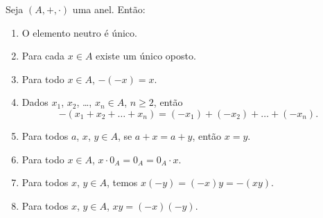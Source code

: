 \begin{proposicao}
	Seja $(A, + , \cdot)$ uma anel. Então:
	\begin{enumerate}[label={\roman*})]
		\item O elemento neutro {\'e} {\'u}nico.
		\item Para cada $x \in A$ existe um {\'u}nico oposto.
		\item Para todo $x \in A$, $-(-x) = x$.
		\item Dados $x_{1}$, $x_{2}$, \dots, $x_n \in A$, $n \geqslant 2$, ent{\~a}o
		\[
			-(x_1 + x_2 + \dots + x_n) = (-x_1) + (-x_2) + \dots + (-x_n).
		\]
		\item Para todos $a$, $x$, $y \in A$, se $a + x = a + y$, ent{\~a}o $x = y$.
		\item Para todo $x \in A$, $x\cdot 0_A = 0_A = 0_A\cdot x$.
		\item Para todos $x$, $y \in A$, temos $x(-y) = (-x)y = -(xy)$.
		\item Para todos $x$, $y \in A$, $xy = (-x)(-y)$.
	\end{enumerate}
\end{proposicao}
